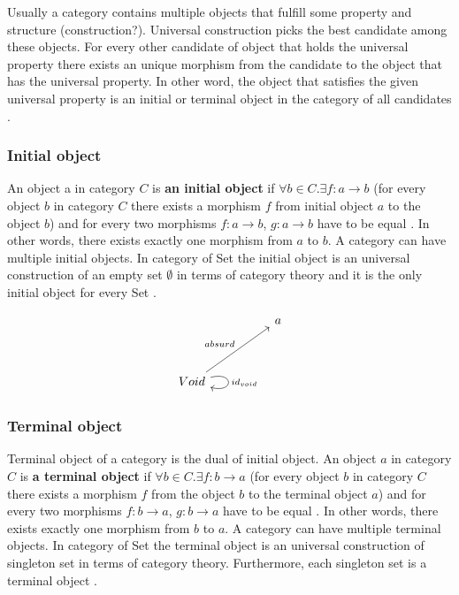 \documentclass[article]{aaltoseries}
\begin{document}
    Usually a category contains multiple objects that fulfill some property and
    structure (construction?). Universal construction picks the best candidate among
    these objects. For every other candidate of object that holds the universal
    property there exists an unique morphism from the candidate to the object that
    has the universal property. In other word, the object that satisfies the given
    universal property is an initial or terminal object in the category of all
    candidates \cite{pierce1991basic}.
  

  \subsubsection{Initial object}
    An object a in category $C$ is \textbf{an initial object} if $\forall b \in
    C. \exists f: a \rightarrow b$ (for every object $b$ in category $C$ there
    exists a morphism $f$ from initial object $a$ to the object $b$) and for
    every two morphisms $f: a \rightarrow b$, $g: a \rightarrow b$ have to be
    equal \cite{barr1990category, pierce1991basic}. In other words, there exists
    exactly one morphism from $a$ to $b$. A category can have multiple initial
    objects. In category of Set the initial object is an universal construction
    of an empty set $\emptyset$ in terms of category theory and it is the only initial
    object for every Set \cite{barr1990category, pierce1991basic}.

    \begin{equation}
      \label{initial}
      \begin{tikzcd}[row sep=huge, column sep=huge]
        & a \\
        Void \arrow[ur, "absurd"]
        \arrow[loop right, distance=2em, "id_{void}"]
        & 
      \end{tikzcd}
    \end{equation}


  \subsubsection{Terminal object}
    Terminal object of a category is the dual of initial object. An object $a$
    in category $C$ is \textbf{a terminal object} if $\forall b \in C. \exists
    f: b \rightarrow a$ (for every object $b$ in category $C$ there exists a
    morphism $f$ from the object $b$ to the terminal object $a$) and for every
    two morphisms $f: b \rightarrow a$, $g: b \rightarrow a$ have to be equal
    \cite{barr1990category, pierce1991basic}. In other words, there exists
    exactly one morphism from $b$ to $a$. A category can have multiple terminal
    objects. In category of Set the terminal object is an universal construction
    of singleton set in terms of category theory. Furthermore, each singleton
    set is a terminal object \cite{barr1990category, pierce1991basic}.
\end{document}
